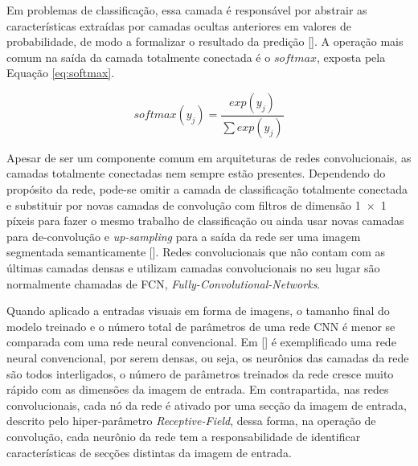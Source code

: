 \begin{enumerate}
            Em problemas de classificação, essa camada é responsável por abstrair as características extraídas por camadas ocultas anteriores em 
            valores de probabilidade, de modo a formalizar o resultado da predição []. A operação mais comum na saída 
            da camada totalmente conectada é o $softmax$, exposta pela Equação \ref{eq:softmax}.
            
            \begin{equation}
                \label{eq:softmax}
                softmax(y_j) = \frac{exp(y_j)}{\sum exp(y_j)}
            \end{equation}
            
            Apesar de ser um componente comum em arquiteturas de redes convolucionais, as camadas totalmente conectadas nem sempre estão 
            presentes. Dependendo do propósito da rede, pode-se omitir a camada de classificação totalmente conectada e substituir por novas camadas 
            de convolução com filtros de dimensão 1 × 1 píxeis para fazer o mesmo trabalho de classificação ou ainda usar novas camadas para 
            de-convolução e \textit{up-sampling} para a saída da rede ser uma imagem segmentada semanticamente []. Redes convolucionais 
            que não contam com as últimas camadas densas e utilizam camadas convolucionais no seu lugar são normalmente chamadas de FCN, \textit{Fully-Convolutional-Networks}.
\end{enumerate}

Quando aplicado a entradas visuais em forma de imagens, o tamanho final do modelo treinado e o número total de parâmetros de uma rede CNN é menor se 
comparada com uma rede neural convencional. Em [] é exemplificado uma rede neural convencional, por serem densas, ou seja, os 
neurônios das camadas da rede são todos interligados, o número de parâmetros treinados da rede cresce muito rápido com as dimensões da imagem de entrada. 
Em contrapartida, nas redes convolucionais, cada nó da rede é ativado por uma secção da imagem de entrada, descrito pelo hiper-parâmetro \textit{Receptive-Field}, 
dessa forma, na operação de convolução, cada neurônio da rede tem a responsabilidade de identificar características de secções distintas da imagem de entrada.

